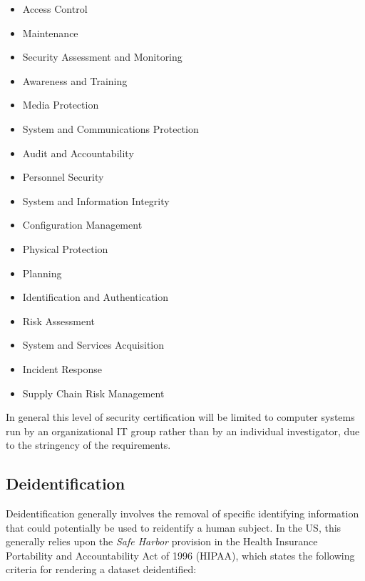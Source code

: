 \begin{itemize}
\item Access Control
\item Maintenance
\item Security Assessment and Monitoring
\item Awareness and Training
\item Media Protection
\item System and Communications Protection
\item Audit and Accountability
\item Personnel Security
\item System and Information Integrity
\item Configuration Management
\item Physical Protection
\item Planning
\item Identification and Authentication
\item Risk Assessment
\item System and Services Acquisition
\item Incident Response
\item Supply Chain Risk Management
\end{itemize}

In general this level of security certification will be limited to computer systems run by an organizational IT group rather than by an individual investigator, due to the stringency of the requirements.

\subsection{Deidentification}

Deidentification generally involves the removal of specific identifying information that could potentially be used to reidentify a human subject.  In the US, this generally relies upon the \textit{Safe Harbor} provision in the Health Insurance Portability and Accountability Act of 1996 (HIPAA), which states the following criteria for rendering a dataset deidentified:

